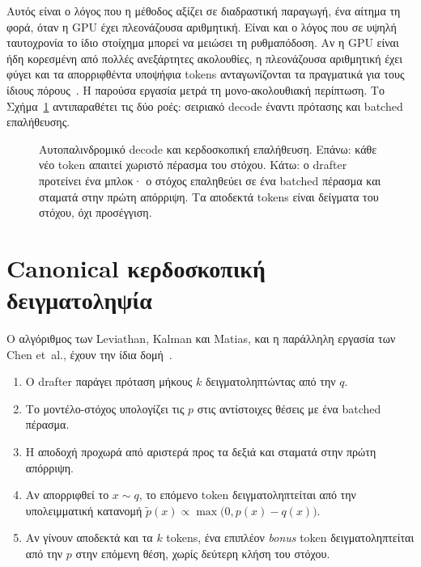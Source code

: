 \documentclass[a4paper,12pt]{report}
\theoremstyle{plain}
\theoremstyle{definition}
\theoremstyle{remark}
\begin{document}
Αυτός είναι ο λόγος που η μέθοδος αξίζει σε διαδραστική παραγωγή, ένα αίτημα
τη φορά, όταν η GPU έχει πλεονάζουσα αριθμητική. Είναι και ο λόγος που σε
υψηλή ταυτοχρονία το ίδιο στοίχημα μπορεί να μειώσει τη ρυθμαπόδοση. Αν η GPU
είναι ήδη κορεσμένη από πολλές ανεξάρτητες ακολουθίες, η πλεονάζουσα
αριθμητική έχει φύγει και τα απορριφθέντα υποψήφια tokens ανταγωνίζονται τα
πραγματικά για τους ίδιους πόρους~\cite{vllm-speculative-docs}. Η παρούσα
εργασία μετρά τη μονο-ακολουθιακή περίπτωση. Το Σχήμα~\ref{fig:ar-vs-spec}
αντιπαραθέτει τις δύο ροές: σειριακό decode έναντι πρότασης και batched
επαλήθευσης.

\begin{figure}[htbp]
  \centering
  \resizebox{\linewidth}{!}{}
  \caption{Αυτοπαλινδρομικό decode και κερδοσκοπική επαλήθευση. Επάνω: κάθε
    νέο token απαιτεί χωριστό πέρασμα του στόχου. Κάτω: ο drafter προτείνει ένα
    μπλοκ· ο στόχος επαληθεύει σε ένα batched πέρασμα και σταματά στην πρώτη
  απόρριψη. Τα αποδεκτά tokens είναι δείγματα του στόχου, όχι προσέγγιση.}
  \label{fig:ar-vs-spec}
\end{figure}

\section{Canonical κερδοσκοπική δειγματοληψία}
\label{sec:canonical}

Ο αλγόριθμος των Leviathan, Kalman και Matias, και η παράλληλη εργασία των
Chen et~al., έχουν την ίδια δομή~\cite{leviathan2023fast,chen2023accelerating}.

\begin{enumerate}[leftmargin=*]
  \item Ο drafter παράγει πρόταση μήκους \(k\) δειγματοληπτώντας από την \(q\).
  \item Το μοντέλο-στόχος υπολογίζει τις \(p\) στις αντίστοιχες θέσεις με ένα
    batched πέρασμα.
  \item Η αποδοχή προχωρά από αριστερά προς τα δεξιά και σταματά στην πρώτη
    απόρριψη.
  \item Αν απορριφθεί το \(x\sim q\), το επόμενο token δειγματοληπτείται από την
    υπολειμματική κατανομή
    \(\tilde p(x)\propto\max\bigl(0,p(x)-q(x)\bigr)\).
  \item Αν γίνουν αποδεκτά και τα \(k\) tokens, ένα επιπλέον \emph{bonus} token
    δειγματοληπτείται από την \(p\) στην επόμενη θέση, χωρίς δεύτερη κλήση του
    στόχου.
\end{enumerate}
\end{document}
